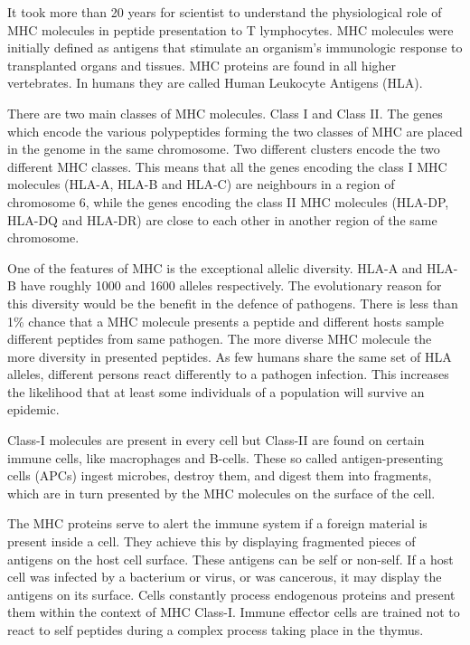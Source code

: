 
It took more than 20 years for scientist to understand the  physiological role of MHC molecules in peptide presentation to T lymphocytes. 
MHC molecules were initially defined as antigens that stimulate an organism’s immunologic response to transplanted organs and tissues. MHC proteins are found in all higher vertebrates. 
In humans they are called Human Leukocyte Antigens (HLA).

There are two main classes of MHC molecules. Class I and Class II. The genes which encode the various polypeptides forming the two classes of MHC are placed in the genome in the same chromosome.
Two different clusters encode the two different MHC classes. This means that all the genes encoding the class I MHC molecules (HLA-A, HLA-B and HLA-C) are neighbours in a region of chromosome 6,
while the genes encoding the class II MHC molecules (HLA-DP, HLA-DQ and HLA-DR) are close to each other in another region of the same chromosome.

One of the features of MHC is the exceptional allelic diversity. HLA-A and HLA-B have roughly 1000 and 1600 alleles respectively. 
The evolutionary reason for this diversity would be the benefit in the defence of pathogens. 
There is less than 1\% chance that a MHC molecule presents a peptide and different hosts sample different peptides from same pathogen. 
The more diverse MHC molecule the more diversity in presented peptides. As few humans share the same set of HLA alleles, different persons react differently to a pathogen infection. 
This increases the likelihood that at least some individuals of a population will survive an epidemic.

Class-I molecules are present in every cell but Class-II are found on certain immune cells, like macrophages and B-cells. 
These so called antigen-presenting cells (APCs) ingest microbes, destroy them, and digest them into fragments, which are in turn presented by the MHC molecules on the surface of the cell.

The MHC proteins serve to alert the immune system if a foreign material is present inside a cell.
They achieve this by displaying fragmented pieces of antigens on the host cell surface. These antigens can be self or non-self. 
If a host cell was infected by a bacterium or virus, or was cancerous, it may  display the antigens on its surface.
Cells constantly process endogenous proteins and present them within the context of MHC Class-I. 
Immune effector cells are trained not to react to self peptides during a complex process taking place in the thymus.

